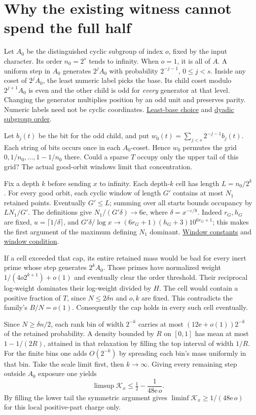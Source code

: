 \documentclass[12pt,letterpaper]{article}
\newcommand{\orig}[3]{\href{https://github.com/nousentllc/riemann-hypothesis/blob/40e56bab026552e089d7afcfeff08d2defb9c005/src/#1.lean\#L#2}{#3}}
\newcommand{\pagepart}[1]{\clearpage\section{#1}}
\begin{document}
\pagepart{Why the existing witness cannot spend the full half}
Let \(A_0\) be the distinguished cyclic subgroup of index \(o\), fixed by the input character. Its order \(n_0=2^s\) tends to infinity. When \(o=1\), it is all of \(A\). A uniform step in \(A_0\) generates \(2^jA_0\) with probability \(2^{-j-1}\), \(0\le j<s\). Inside any coset of \(2^jA_0\), the least numeric label picks the base. Its child coset modulo \(2^{j+1}A_0\) is even and the other child is odd for \emph{every} generator at that level. Changing the generator multiplies position by an odd unit and preserves parity. Numeric labels need not be cyclic coordinates. \orig{Formalism/LocalToGlobal/GlobalTheory/IsResidueClassZero}{267}{Least-base choice} and \orig{Formalism/SharpRestriction/RamificationFrobenius/TotientGaloisClasses/FrameFacts}{249}{dyadic subgroup order}.

Let \(b_j(t)\) be the bit for the odd child, and put \(w_0(t)=\sum_{j<s}2^{-j-1}b_j(t)\). Each string of bits occurs once in each \(A_0\)-coset. Hence \(w_0\) permutes the grid \(0,1/n_0,\ldots,1-1/n_0\) there. Could a sparse \(T\) occupy only the upper tail of this grid? The actual good-orbit windows limit that concentration.

Fix a depth \(k\) before sending \(x\) to infinity. Each depth-\(k\) cell has length \(L=n_0/2^k\). For every good orbit, each cyclic window of length \(G'\) contains at most \(N_1\) retained points. Eventually \(G'\le L\); summing over all starts bounds occupancy by \(LN_1/G'\). The definitions give \(N_1/(G'\delta)\to6\mathrm e\), where \(\delta=x^{-\varepsilon/8}\). Indeed \(r_G,h_G\) are fixed, \(u=\lceil1/\delta\rceil\), and \(G'\delta/\log x\to(6r_G+1)(h_G+3)10^{6r_G+1}\); this makes the first argument of the maximum defining \(N_1\) dominant. \orig{Formalism/SharpRestriction/GrowthBounds/UnramifiedQuadraticSetting}{237}{Window constants} and \orig{Formalism/SubspaceCounting/GoodOrbitIntervalTileCondition}{21}{window condition}.

If a cell exceeded that cap, its entire retained mass would be bad for every inert prime whose step generates \(2^kA_0\). Those primes have normalized weight \(1/(4o2^{k+1})+o(1)\) and eventually clear the order threshold. Their reciprocal log-weight dominates their log-weight divided by \(H\). The cell would contain a positive fraction of \(T\), since \(N\le2\delta n\) and \(o,k\) are fixed. This contradicts the family's \(B/N=o(1)\). Consequently the cap holds in every such cell eventually.

Since \(N\ge\delta n/2\), each rank bin of width \(2^{-k}\) carries at most \((12\mathrm e+o(1))2^{-k}\) of the retained probability. A density bounded by \(R\) on \([0,1]\) has mean at most \(1-1/(2R)\), attained in that relaxation by filling the top interval of width \(1/R\). For the finite bins one adds \(O(2^{-k})\) by spreading each bin's mass uniformly in that bin. Take the scale limit first, then \(k\to\infty\). Giving every remaining step outside \(A_0\) exposure one yields
\[
 \limsup\mathcal K_x\le\tfrac12-\frac1{48\mathrm e\,o}.
\]
By filling the lower tail the symmetric argument gives \(\liminf\mathcal K_x\ge1/(48\mathrm e\,o)\) for this local positive-part charge only.
\end{document}

